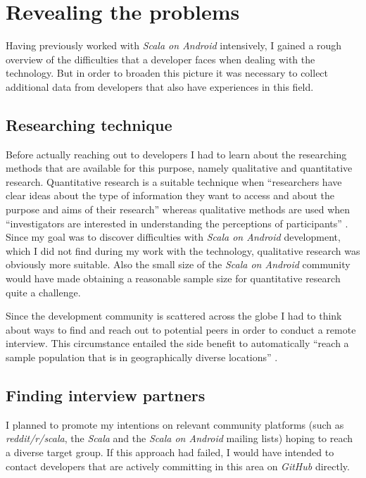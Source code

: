 \section{Revealing the problems}

Having previously worked with \textit{Scala on Android} intensively, I gained a rough overview of the difficulties that a developer faces when dealing with the technology. But in order to broaden this picture it was necessary to collect additional data from developers that also have experiences in this field.

\subsection{Researching technique}

Before actually reaching out to developers I had to learn about the researching methods that are available for this purpose, namely qualitative and quantitative research. Quantitative research is a suitable technique when \enquote{researchers have clear ideas about the type of information they want to access and about the purpose and aims of their research} \cite[p. 72]{berg01} whereas qualitative methods are used when \enquote{investigators are interested in understanding the perceptions of participants} \cite[p. 72]{berg01}. Since my goal was to discover difficulties with \textit{Scala on Android} development, which I did not find during my work with the technology, qualitative research was obviously more suitable. Also the small size of the \textit{Scala on Android} community would have made obtaining a reasonable sample size for quantitative research quite a challenge.

Since the development community is scattered across the globe I had to think about ways to find and reach out to potential peers in order to conduct a remote interview. This circumstance entailed the side benefit to automatically \enquote{reach a sample population that is in geographically diverse locations} \cite[p. 82]{berg01}.

\subsection{Finding interview partners}

I planned to promote my intentions on relevant community platforms (such as \textit{reddit/r/scala}, the \textit{Scala} and the \textit{Scala on Android} mailing lists) hoping to reach a diverse target group. If this approach had failed, I would have intended to contact developers that are actively committing in this area on \textit{GitHub} directly.

